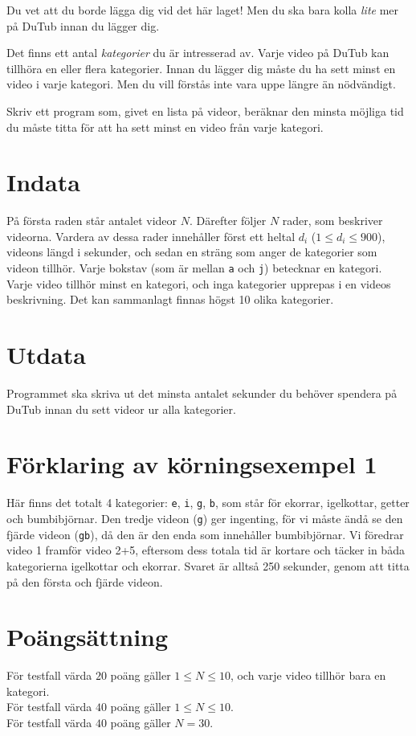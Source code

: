 
Du vet att du borde lägga dig vid det här laget! Men du ska bara kolla
{\em lite} mer på DuTub innan du lägger dig.

Det finns ett antal {\em kategorier} du är intresserad av. Varje
video på DuTub kan tillhöra en eller flera kategorier. Innan du lägger
dig måste du ha sett minst en video i varje kategori. Men du vill
förstås inte vara uppe längre än nödvändigt.

Skriv ett program som, givet en lista på videor, beräknar den minsta
möjliga tid du måste titta för att ha sett minst en video från varje kategori.

\section*{Indata}

På första raden står antalet videor $N$.
Därefter följer $N$ rader, som beskriver videorna.
Vardera av dessa rader innehåller först ett heltal $d_i$ ($1 \le d_i \le 900$), videons längd i sekunder,
och sedan en sträng som anger de kategorier som videon tillhör. Varje
bokstav (som är mellan \texttt a och \texttt j) betecknar en kategori. Varje
video tillhör minst en kategori, och inga kategorier upprepas i en videos
beskrivning. Det kan sammanlagt finnas högst 10 olika kategorier. 

\section*{Utdata}

Programmet ska skriva ut det minsta antalet sekunder du behöver spendera på DuTub innan du sett videor ur alla kategorier.

\section*{Förklaring av körningsexempel 1}

Här finns det totalt 4 kategorier: \texttt e, \texttt i, \texttt g, \texttt b, som står för ekorrar, igelkottar, getter och bumbibjörnar. Den tredje videon (\texttt{g}) ger ingenting, för vi måste ändå se den fjärde videon (\texttt{gb}), då den är den enda som innehåller bumbibjörnar. Vi föredrar video 1 framför video 2+5, eftersom dess totala tid är
kortare och täcker in båda kategorierna igelkottar och ekorrar. Svaret är alltså 250 sekunder, genom att titta på den första och fjärde videon.

\section*{Poängsättning}
För testfall värda $20$ poäng gäller $1 \le N \le 10$, och varje video tillhör bara en kategori.\\
För testfall värda $40$ poäng gäller $1 \le N \le 10$.\\
För testfall värda $40$ poäng gäller $N = 30$.
